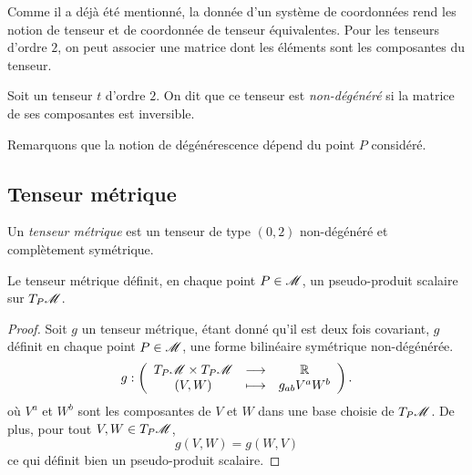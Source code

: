 \documentclass[a4paper,11pt]{report}
\begin{document}
                Comme il a déjà été mentionné, la donnée d'un système de coordonnées rend les notion de tenseur et de coordonnée de tenseur équivalentes. Pour les tenseurs d'ordre $2$, on peut associer une matrice dont les éléments sont les composantes du tenseur.\\
                
                \begin{defn}
                    Soit un tenseur $t$ d'ordre $2$. On dit que ce tenseur est \textit{non-dégénéré} si la matrice de ses composantes est inversible.
                \end{defn}
                
                Remarquons que la notion de dégénérescence dépend du point $P$ considéré.
                
            \subsection{Tenseur métrique}
                
                \begin{defn}
                    Un \textit{tenseur métrique} est un tenseur de type $(0,2)$ non-dégénéré et complètement symétrique.
                \end{defn}
                
                \begin{prop}\begin{leftbar}
                    Le tenseur métrique définit, en chaque point $P\in\mathscr{M}$, un pseudo-produit scalaire sur $T_P\mathscr{M}$.
                \end{leftbar}\end{prop}
                
                \begin{proof}
                    Soit $g$ un tenseur métrique, étant donné qu'il est deux fois covariant, $g$ définit en chaque point $P\in\mathscr{M}$, une forme bilinéaire symétrique non-dégénérée.
                \begin{equation}
                    g:\left(
                \begin{array}{ccc}
                    T_P\mathscr{M}\times T_P\mathscr{M} & \longrightarrow & \mathbb{R} \\
                    (V,W) & \longmapsto & g_{ab}V^a W^b
                \end{array}
                \right).
                \end{equation}
                où $V^a$ et $W^b$ sont les composantes de $V$ et $W$ dans une base choisie de $T_P\mathscr{M}$. De plus, pour tout $V,W\in T_P\mathscr{M}$,
                \begin{equation}
                    g(V,W) = g(W,V)
                \end{equation}
                ce qui définit bien un pseudo-produit scalaire.
                \end{proof}
                
\end{document}
